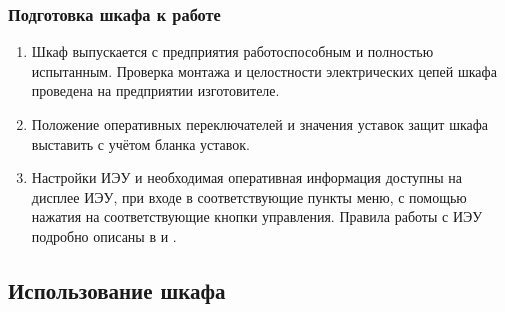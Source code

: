 \subsubsection{Подготовка шкафа к работе}

\begin{enumerate}[label=\arabic{section}.\arabic{subsection}.\arabic{subsubsection}.\arabic*, align=left, labelsep=4pt, leftmargin=0pt, itemindent=2cm]

\item
Шкаф выпускается с предприятия работоспособным и полностью испытанным.
Проверка монтажа и целостности электрических цепей шкафа проведена на предприятии изготовителе.

\item
Положение оперативных переключателей и значения уставок защит шкафа выставить с учётом бланка уставок.

\item
Настройки ИЭУ и необходимая оперативная информация доступны на дисплее ИЭУ, при входе в соответствующие пункты меню, с помощью нажатия на соответствующие кнопки управления.
Правила работы с ИЭУ подробно описаны в \ManualUnitGeneral и  \ManualUnitDefinite.

\end{enumerate}

\color{unidarkgreen}\subsection{Использование шкафа}\color{black}

